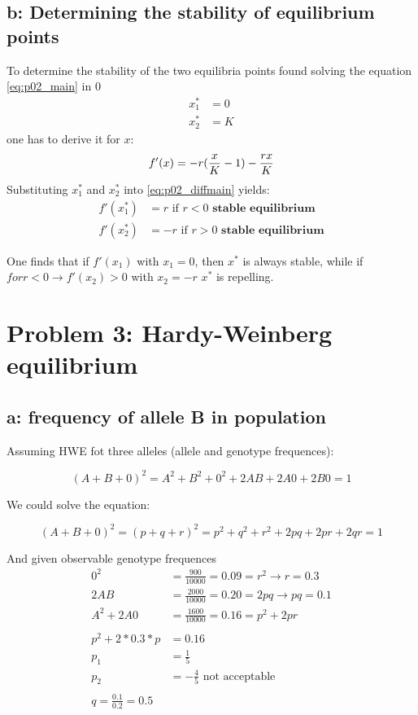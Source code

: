 \subsection{b: Determining the stability of equilibrium points}

To determine the stability of the two equilibria points found solving the equation \ref{eq:p02_main} in $0$
\begin{align}
x^*_1 &= 0\\
x^*_2 &= K
\end{align}
one has to derive it for $x$:
\begin{equation}
f'(x) = - r(\frac{x}{K} - 1) - \frac{rx}{K}\\
\label{eq:p02_diffmain}
\end{equation}
Substituting $x^*_1$ and $x^*_2$ into \ref{eq:p02_diffmain} yields:
\begin{align}
f'(x^*_1) &= r \text{ if } r < 0 \textbf{ stable equilibrium}\\
f'(x^*_2) &= -r \text{ if } r > 0 \textbf{ stable equilibrium}
\end{align}

One finds that if $ f'(x_1) $ with $x_1 = 0$, then $x^{\ast}$ is always stable, while if $ for r < 0 \rightarrow f'(x_2) > 0 $ with $x_2 = -r $ $x^{\ast}$ is repelling.



\setcounter{chapter}{3}
\setcounter{section}{0}
\section{Problem 3: Hardy-Weinberg equilibrium}
\subsection{a: frequency of allele B in population}
Assuming HWE fot three alleles (allele and genotype frequences):

\[  (A+B+0)^2 = A^2 + B^2 + 0^2 + 2AB + 2A0 + 2B0 = 1  \]

We could solve the equation: 

\[  (A+B+0)^2 = (p+q+r)^2 = p^2 + q^2 + r^2 + 2pq + 2pr + 2qr = 1  \]

And given observable genotype frequences
\begin{align}
0^2 &= \frac{900}{10000} = 0.09 = r^2 \rightarrow r = 0.3 \\
2AB &= \frac{2000}{10000} = 0.20 = 2pq \rightarrow pq = 0.1 \\
A^2 + 2A0 &= \frac{1600}{10000} = 0.16 = p^2 + 2pr\\
\\
p^2+2*0.3*p &= 0.16 \\
p_1 &= \frac{1}{5} \\
p_2 &= -\frac{4}{5} \text{~not acceptable}\\
\\
q = \frac{0.1}{0.2} = 0.5
\end{align}

